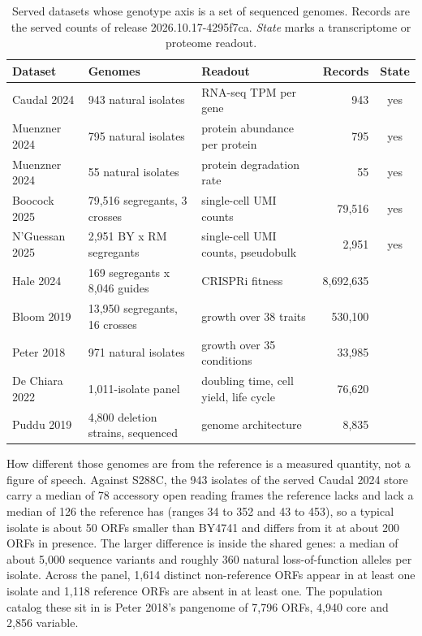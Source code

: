 \begin{table}[H]\centering
\small
\caption[]{Served datasets whose genotype axis is a set of sequenced genomes. Records are
the served counts of release 2026.10.17-4295f7ca. \emph{State} marks a transcriptome or
proteome readout.}
\label{tab:state-served}
\begin{tabular}{@{}l l l r c@{}}
\toprule
Dataset & Genomes & Readout & Records & State \\
\midrule
Caudal 2024 & 943 natural isolates & RNA-seq TPM per gene & 943 & yes \\
Muenzner 2024 & 795 natural isolates & protein abundance per protein & 795 & yes \\
Muenzner 2024 & 55 natural isolates & protein degradation rate & 55 & yes \\
Boocock 2025 & 79,516 segregants, 3 crosses & single-cell UMI counts & 79,516 & yes \\
N'Guessan 2025 & 2,951 BY x RM segregants & single-cell UMI counts, pseudobulk & 2,951 & yes \\
Hale 2024 & 169 segregants x 8,046 guides & CRISPRi fitness & 8,692,635 & \\
Bloom 2019 & 13,950 segregants, 16 crosses & growth over 38 traits & 530,100 & \\
Peter 2018 & 971 natural isolates & growth over 35 conditions & 33,985 & \\
De Chiara 2022 & 1,011-isolate panel & doubling time, cell yield, life cycle & 76,620 & \\
Puddu 2019 & 4,800 deletion strains, sequenced & genome architecture & 8,835 & \\
\bottomrule
\end{tabular}
\end{table}

How different those genomes are from the reference is a measured quantity, not a
figure of speech. Against S288C, the 943 isolates of the served Caudal 2024 store carry a
median of 78 accessory open reading frames the reference lacks and lack a median of 126
the reference has (ranges 34 to 352 and 43 to 453), so a typical isolate is about 50 ORFs
smaller than BY4741 and differs from it at about 200 ORFs in presence. The larger
difference is inside the shared genes: a median of about 5,000 sequence variants and
roughly 360 natural loss-of-function alleles per isolate. Across the panel, 1,614 distinct
non-reference ORFs appear in at least one isolate and 1,118 reference ORFs are absent in at
least one. The population catalog these sit in is Peter 2018's pangenome of 7,796 ORFs,
4,940 core and 2,856 variable.


